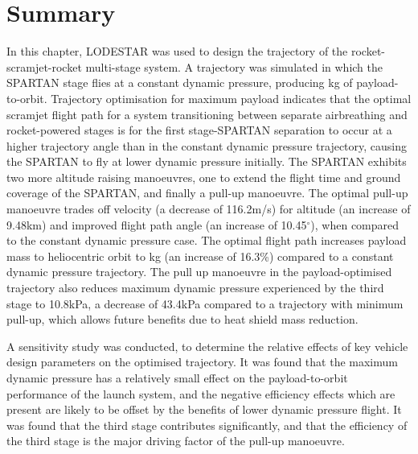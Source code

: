 \section{Summary}


In this chapter, LODESTAR was used to design the trajectory of the rocket-scramjet-rocket multi-stage system. 
A trajectory was simulated in which the SPARTAN stage flies at a constant dynamic pressure, producing \PayloadToOrbitConstq kg of payload-to-orbit. Trajectory optimisation for maximum payload indicates that the optimal scramjet flight path for a system transitioning between separate airbreathing and rocket-powered stages is for the first stage-SPARTAN separation to occur at a higher trajectory angle than in the constant dynamic pressure trajectory, causing the SPARTAN to fly at lower dynamic pressure initially. The SPARTAN exhibits two more altitude raising manoeuvres, one to extend the flight time and ground coverage of the SPARTAN, and finally a pull-up manoeuvre. The optimal pull-up manoeuvre trades off velocity (a decrease of 116.2m/s) for altitude (an increase of 9.48km) and improved flight path angle (an increase of 10.45$^\circ$), when compared to the constant dynamic pressure case. The optimal flight path increases payload mass to heliocentric orbit to \PayloadToOrbitStandard kg (an increase of 16.3\%) compared to a constant dynamic pressure trajectory. The pull up manoeuvre in the payload-optimised trajectory also reduces maximum dynamic pressure experienced by the third stage to 10.8kPa, a decrease of 43.4kPa compared to a trajectory with minimum pull-up, which allows future benefits due to heat shield mass reduction.  

A sensitivity study was conducted, to determine the relative effects of key vehicle design parameters on the optimised trajectory. It was found that the maximum dynamic pressure has a relatively small effect on the payload-to-orbit performance of the launch system, and the negative efficiency effects which are present are likely to be offset by the benefits of lower dynamic pressure flight. 
It was found that the third stage contributes significantly, and that the efficiency of the third stage is the major driving factor of the pull-up manoeuvre. 
